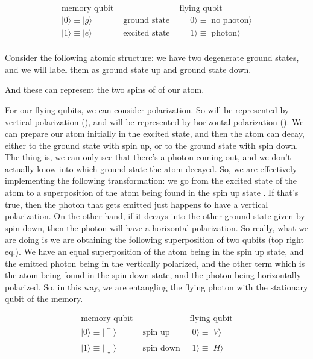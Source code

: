 \begin{equation}
\begin{array}{lll}
\text{memory qubit} & & \text{flying qubit} \\

|0\rangle \equiv|g\rangle \quad & \text { ground state } & \quad|0\rangle \equiv \mid \text {no photon}\rangle \\
|1\rangle \equiv|e\rangle \quad & \text { excited state } & \quad|1\rangle \equiv \mid \text {photon}\rangle \\
\end{array}
\end{equation}

Consider the following atomic structure: we have two degenerate ground states, and we will label them as ground state up and ground state down.

And these can represent the two spins of of our atom.

For our flying qubits, we can consider polarization. So  will be represented by vertical polarization (), and  will be represented by horizontal polarization (). We can prepare our atom initially in the excited state, and then the atom can decay, either to the ground state with spin up, or to the ground state with spin down. The thing is, we can only see that there's a photon coming out, and we don't actually know into which ground state the atom decayed. So, we are effectively implementing the following transformation: we go from the excited state of the atom to a superposition of the atom being found in the spin up state . If that's true, then the photon that gets emitted just happens to have a vertical polarization. On the other hand, if it decays into the other ground state given by spin down, then the photon will have a horizontal polarization. So really, what we are doing is we are obtaining the following superposition of two qubits (top right eq.). We have an equal superposition of the atom being in the spin up state, and the emitted photon being in the vertically polarized, and the other term which is the atom being found in the spin down state, and the photon being horizontally polarized. So, in this way, we are entangling the flying photon with the stationary qubit of the memory.

\begin{equation}
\begin{array}{lll}
\text{memory qubit} & & \text{flying qubit} \\
|0\rangle \equiv|\uparrow\rangle & \text { spin up } & |0\rangle \equiv|V\rangle \\
|1\rangle \equiv|\downarrow\rangle & \text { spin down } & |1\rangle \equiv|H\rangle
\end{array}
\end{equation}

